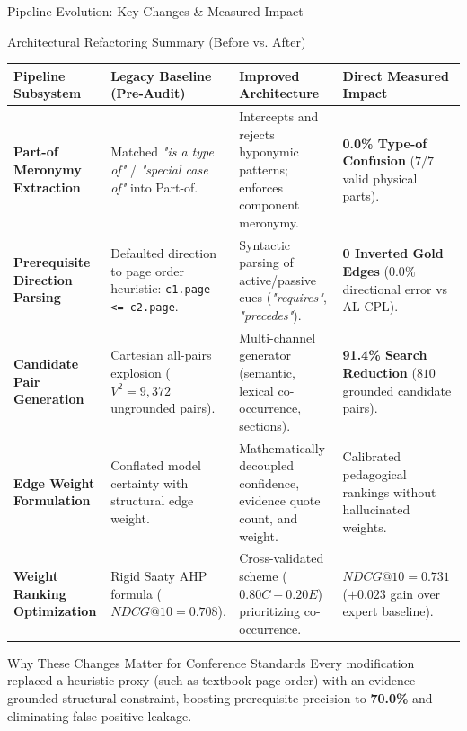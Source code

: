 \documentclass[aspectratio=169,10pt]{beamer}
\begin{document}
\begin{frame}{Pipeline Evolution: Key Changes \& Measured Impact}
    \begin{block}{Architectural Refactoring Summary (Before vs. After)}
        \centering
        \scriptsize
        \begin{tabularx}{\textwidth}{p{2.3cm} p{3.4cm} p{3.8cm} X}
            \toprule
            \textbf{Pipeline Subsystem} & \textbf{Legacy Baseline (Pre-Audit)} & \textbf{Improved Architecture} & \textbf{Direct Measured Impact} \\
            \midrule
            \textbf{Part-of Meronymy Extraction} & Matched \textit{"is a type of"} / \textit{"special case of"} into Part-of. & Intercepts and rejects hyponymic patterns; enforces component meronymy. & \textbf{0.0\% Type-of Confusion} ($7/7$ valid physical parts). \\
            \addlinespace
            \textbf{Prerequisite Direction Parsing} & Defaulted direction to page order heuristic: \texttt{c1.page <= c2.page}. & Syntactic parsing of active/passive cues (\textit{"requires"}, \textit{"precedes"}). & \textbf{0 Inverted Gold Edges} ($0.0\%$ directional error vs AL-CPL). \\
            \addlinespace
            \textbf{Candidate Pair Generation} & Cartesian all-pairs explosion ($V^2 = 9,372$ ungrounded pairs). & Multi-channel generator (semantic, lexical co-occurrence, sections). & \textbf{91.4\% Search Reduction} ($810$ grounded candidate pairs). \\
            \addlinespace
            \textbf{Edge Weight Formulation} & Conflated model certainty with structural edge weight. & Mathematically decoupled confidence, evidence quote count, and weight. & Calibrated pedagogical rankings without hallucinated weights. \\
            \addlinespace
            \textbf{Weight Ranking Optimization} & Rigid Saaty AHP formula ($NDCG@10 = 0.708$). & Cross-validated scheme ($0.80 C + 0.20 E$) prioritizing co-occurrence. & \textbf{$NDCG@10 = 0.731$} ($+0.023$ gain over expert baseline). \\
            \bottomrule
        \end{tabularx}
    \end{block}

    \vspace{0.1cm}
    \begin{alertblock}{Why These Changes Matter for Conference Standards}
        \footnotesize Every modification replaced a heuristic proxy (such as textbook page order) with an evidence-grounded structural constraint, boosting prerequisite precision to \textbf{70.0\%} and eliminating false-positive leakage.
    \end{alertblock}
\end{frame}
\end{document}
